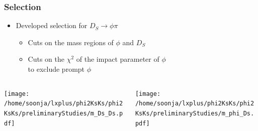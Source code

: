 \documentclass{beamer}
\begin{document}
\begin{frame}
\frametitle{Selection}

\begin{itemize}
\item Developed selection for $D_S \rightarrow \phi \pi$
\begin{itemize}
\item Cuts on the mass regions of $\phi$ and $D_S$
\item Cuts on the $\chi^2$ of the impact parameter of  $\phi$\\ to exclude prompt $\phi$
\end{itemize}
\end{itemize}
\vspace*{-.2cm}
\begin{columns}
\begin{column}{.5\columnwidth}
\texttt{[image: /home/soonja/lxplus/phi2KsKs/phi2KsKs/preliminaryStudies/m\_Ds\_Ds.pdf]}
\end{column}
\begin{column}{.5\columnwidth}
\texttt{[image: /home/soonja/lxplus/phi2KsKs/phi2KsKs/preliminaryStudies/m\_phi\_Ds.pdf]}
\end{column}
\end{columns}
\end{frame}
\end{document}
